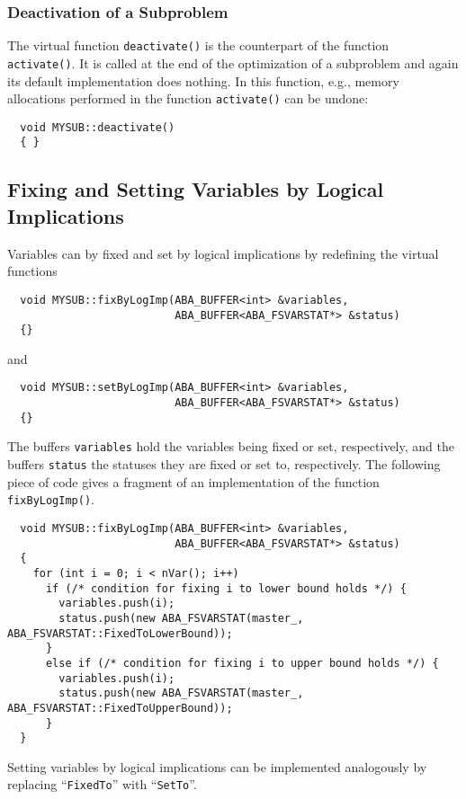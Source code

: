 \subsubsection{Deactivation of a Subproblem}
\noindent
The virtual function {\tt deactivate()} is the counterpart of the function
{\tt activate()}. It is called at the end of the optimization of a subproblem
and again its default implementation does nothing. In this function, e.g.,
memory allocations performed in the function {\tt activate()} can be undone:
\begin{verbatim}
  void MYSUB::deactivate()
  { }
\end{verbatim}


\subsection{Fixing and Setting Variables by Logical Implications}
\noindent
Variables can by fixed and set by logical implications by redefining the virtual 
functions
\begin{verbatim}
  void MYSUB::fixByLogImp(ABA_BUFFER<int> &variables, 
                          ABA_BUFFER<ABA_FSVARSTAT*> &status) 
  {}
\end{verbatim}
\noindent
and
\begin{verbatim}
  void MYSUB::setByLogImp(ABA_BUFFER<int> &variables, 
                          ABA_BUFFER<ABA_FSVARSTAT*> &status) 
  {}
\end{verbatim}
The buffers {\tt variables} hold the variables being fixed or set, 
respectively, and the buffers
{\tt status} the statuses they are fixed or set to, respectively.
The following piece of code gives a fragment of an implementation of
the function {\tt fixByLogImp()}.
\begin{verbatim}
  void MYSUB::fixByLogImp(ABA_BUFFER<int> &variables, 
                          ABA_BUFFER<ABA_FSVARSTAT*> &status)
  {
    for (int i = 0; i < nVar(); i++)
      if (/* condition for fixing i to lower bound holds */) {
        variables.push(i);
        status.push(new ABA_FSVARSTAT(master_, ABA_FSVARSTAT::FixedToLowerBound));
      }
      else if (/* condition for fixing i to upper bound holds */) {
        variables.push(i);
        status.push(new ABA_FSVARSTAT(master_, ABA_FSVARSTAT::FixedToUpperBound));
      }
  }
\end{verbatim}
Setting variables by logical implications can be implemented analogously
by replacing ``{\tt FixedTo}'' with ``{\tt SetTo}''.


